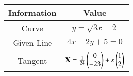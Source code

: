 \begin{tabular}[12pt]{|c|c|}
    \hline
	\textbf{Information} & \textbf{Value} \\ 
    \hline
	Curve & $y=\sqrt{3x-2}$ \\
    \hline 
        Given Line & $4x-2y+5=0$ \\
    \hline   
        Tangent & $\mathbf{X}=\frac{1}{24}\begin{pmatrix}0\\-23\end{pmatrix} + \kappa \begin{pmatrix}1\\2\end{pmatrix}$ \\
    \hline
    \end{tabular}

